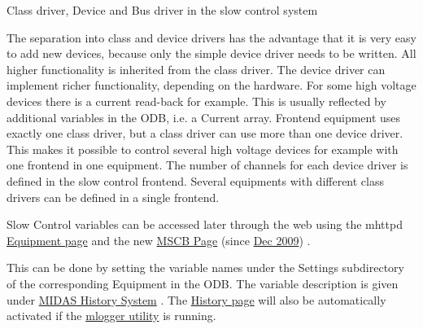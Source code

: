 \begin{center}  Class driver, Device and Bus driver in the slow control system \par
\par
\par
  \end{center}  \par
\par
\par


The separation into class and device drivers has the advantage that it is very easy to add new devices, because only the simple device driver needs to be written. All higher functionality is inherited from the class driver. The device driver can implement richer functionality, depending on the hardware. For some high voltage devices there is a current read-\/back for example. This is usually reflected by additional variables in the ODB, i.e. a Current array. Frontend equipment uses exactly one class driver, but a class driver can use more than one device driver. This makes it possible to control several high voltage devices for example with one frontend in one equipment. The number of channels for each device driver is defined in the slow control frontend. Several equipments with different class drivers can be defined in a single frontend.

Slow Control variables can be accessed later through the web using the mhttpd \hyperlink{RC_mhttpd_Equipment_page}{Equipment page} and  the new \hyperlink{RC_mhttpd_MSCB_page}{MSCB Page} (since \hyperlink{NDF_ndf_dec_2009}{Dec 2009}) .

This can be done by setting the variable names under the Settings subdirectory of the corresponding Equipment in the ODB. The variable description is given under \hyperlink{F_History_logging_F_History_System}{MIDAS History System} . The \hyperlink{RC_mhttpd_History_page}{History page} will also be automatically activated if the \hyperlink{F_Logging_F_mlogger_utility}{mlogger utility} is running.


